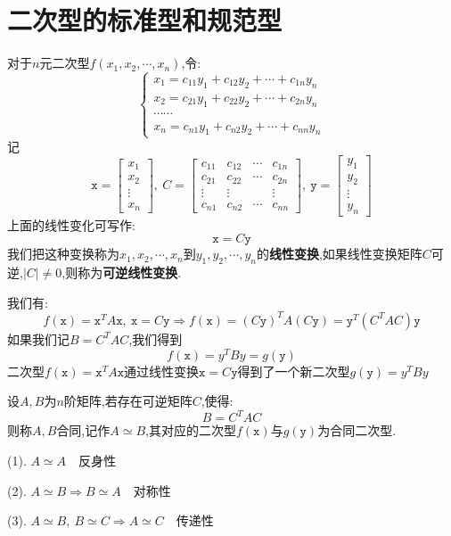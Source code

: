 \section{二次型的标准型和规范型}
\begin{definition}[线性变换]
	对于$n$元二次型$f(x_{1},x_{2},\cdots,x_{n})$,令:  
	$$\left\lbrace 
	\begin{matrix}
		x_{1}=c_{11}y_{1}+c_{12}y_{2}+\cdots+c_{1n}y_{n}\\
		x_{2}=c_{21}y_{1}+c_{22}y_{2}+\cdots+c_{2n}y_{n}\\
		\cdots\cdots\\
		x_{n}=c_{n1}y_{1}+c_{n2}y_{2}+\cdots+c_{nn}y_{n}
	\end{matrix}
	\right. $$
	记$$\mathtt{x}=\left[\begin{matrix}
		x_{1}\\x_{2}\\\vdots\\x_{n}
	\end{matrix} \right],\ C=\left[ \begin{matrix}
	c_{11}&c_{12}&\cdots&c_{1n}\\
	c_{21}&c_{22}&\cdots&c_{2n}\\
	\vdots&\vdots& &\vdots\\
	c_{n1}&c_{n2}&\cdots&c_{nn}
	\end{matrix}\right],\ \mathtt{y}=\left[\begin{matrix}
	y_{1}\\y_{2}\\\vdots\\y_{n}
	\end{matrix} \right]$$
	上面的线性变化可写作:  $$\mathtt{x}=C\mathtt{y}$$
	我们把这种变换称为$x_{1},x_{2},\cdots,x_{n}$到$y_{1},y_{2},\cdots,y_{n}$的\textbf{线性变换},如果线性变换矩阵$C$可逆,$|C|\neq 0$,则称为\textbf{可逆线性变换}.
	
	我们有:  $$f(\mathtt{x})=\mathtt{x}^{T}A\mathtt{x},\ \mathtt{x}=C\mathtt{y}\Rightarrow f(\mathtt{x})=(C\mathtt{y})^{T}A(C\mathtt{y})=\mathtt{y}^{T}(C^{T}AC)\mathtt{y}$$
	如果我们记$B=C^{T}AC$,我们得到$$f(\mathtt{x})=y^{T}By=g(\mathtt{y})$$
	二次型$f(\mathtt{x})=\mathtt{x}^{T}A\mathtt{x}$通过线性变换$\mathtt{x}=C\mathtt{y}$得到了一个新二次型$g(\mathtt{y})=y^{T}By$
\end{definition}
\begin{definition}[矩阵合同]
	设$A,B$为$n$阶矩阵,若存在可逆矩阵$C$,使得:  
	$$B=C^{T}AC$$
	则称$A,B$合同,记作$A\simeq B$,其对应的二次型$f(\mathtt{x})$与$g(\mathtt{y})$为合同二次型.
	\begin{anymark}[注]
		(1). $A\simeq A\quad \text{反身性}$
		
		(2). $A\simeq B\Rightarrow B\simeq A\quad \text{对称性}$
		
		(3). $A\simeq B,\ B\simeq C\Rightarrow A\simeq C\quad \text{传递性}$
	\end{anymark}
\end{definition}
